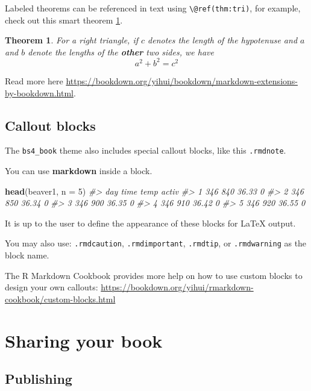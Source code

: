 \documentclass[
]{book}
\newenvironment{Shaded}{\begin{snugshade}}{\end{snugshade}}
\newcommand{\AttributeTok}[1]{\textcolor[rgb]{0.13,0.29,0.53}{#1}}
\newcommand{\CommentTok}[1]{\textcolor[rgb]{0.56,0.35,0.01}{\textit{#1}}}
\newcommand{\DecValTok}[1]{\textcolor[rgb]{0.00,0.00,0.81}{#1}}
\newcommand{\FunctionTok}[1]{\textcolor[rgb]{0.13,0.29,0.53}{\textbf{#1}}}
\newcommand{\NormalTok}[1]{#1}
\newtheorem{theorem}{Theorem}[chapter]
\theoremstyle{definition}
\theoremstyle{definition}
\theoremstyle{definition}
\theoremstyle{definition}
\theoremstyle{remark}
\begin{document}
Labeled theorems can be referenced in text using \texttt{\textbackslash{}@ref(thm:tri)}, for example, check out this smart theorem \ref{thm:tri}.

\begin{theorem}
\protect\hypertarget{thm:tri}{}\label{thm:tri}For a right triangle, if \(c\) denotes the \emph{length} of the hypotenuse
and \(a\) and \(b\) denote the lengths of the \textbf{other} two sides, we have
\[a^2 + b^2 = c^2\]
\end{theorem}

Read more here \url{https://bookdown.org/yihui/bookdown/markdown-extensions-by-bookdown.html}.

\section{Callout blocks}\label{callout-blocks}

The \texttt{bs4\_book} theme also includes special callout blocks, like this \texttt{.rmdnote}.

You can use \textbf{markdown} inside a block.

\begin{Shaded}
\begin{Highlighting}[]
\FunctionTok{head}\NormalTok{(beaver1, }\AttributeTok{n =} \DecValTok{5}\NormalTok{)}
\CommentTok{\#\textgreater{}   day time  temp activ}
\CommentTok{\#\textgreater{} 1 346  840 36.33     0}
\CommentTok{\#\textgreater{} 2 346  850 36.34     0}
\CommentTok{\#\textgreater{} 3 346  900 36.35     0}
\CommentTok{\#\textgreater{} 4 346  910 36.42     0}
\CommentTok{\#\textgreater{} 5 346  920 36.55     0}
\end{Highlighting}
\end{Shaded}

It is up to the user to define the appearance of these blocks for LaTeX output.

You may also use: \texttt{.rmdcaution}, \texttt{.rmdimportant}, \texttt{.rmdtip}, or \texttt{.rmdwarning} as the block name.

The R Markdown Cookbook provides more help on how to use custom blocks to design your own callouts: \url{https://bookdown.org/yihui/rmarkdown-cookbook/custom-blocks.html}

\chapter{Sharing your book}\label{sharing-your-book}

\section{Publishing}\label{publishing}
\end{document}
